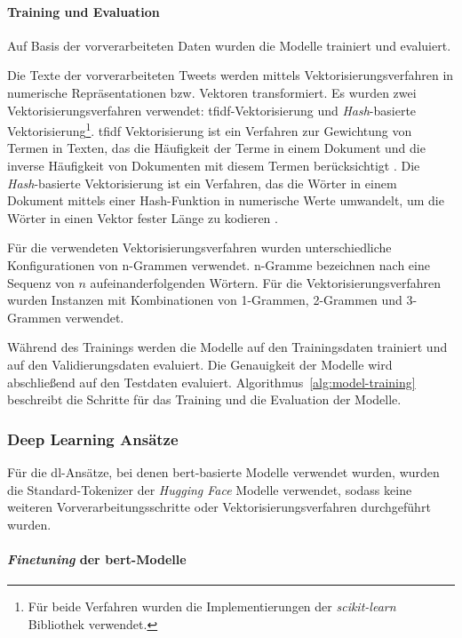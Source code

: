 \paragraph{Training und Evaluation}
Auf Basis der vorverarbeiteten Daten wurden die Modelle trainiert und evaluiert.

Die Texte der vorverarbeiteten Tweets werden mittels Vektorisierungsverfahren in numerische Repräsentationen bzw. Vektoren transformiert.
Es wurden zwei Vekto\-risierungs\-verfahren verwendet: \gls{tfidf}-Vek\-to\-ri\-sie\-rung und \textit{Hash}-basierte Vektorisierung\footnote{Für beide Verfahren wurden die Implementierungen der \textit{scikit-learn} Bibliothek verwendet.}.
\gls{tfidf} Vektorisierung ist ein Verfahren zur Gewichtung von Termen in Texten, das die Häufigkeit der Terme in einem Dokument und die inverse Häufigkeit von Dokumenten mit diesem Termen berücksichtigt \cite[S. 119]{manning2009introduction}.
Die \textit{Hash}-basierte Vektorisierung ist ein Verfahren, das die Wörter in einem Dokument mittels einer Hash-Funktion in numerische Werte umwandelt, um die Wörter in einen Vektor fester Länge zu kodieren \cite{sklearnextraction2025}.

Für die verwendeten Vektorisierungsverfahren wurden unterschiedliche Konfigurationen von n-Grammen verwendet.
n-Gramme bezeichnen nach \cite[S.33]{jm3} eine Sequenz von $n$ aufeinanderfolgenden Wörtern.
Für die Vektorisierungsverfahren wurden Instanzen mit Kombinationen von 1-Grammen, 2-Grammen und 3-Grammen verwendet.

Während des Trainings werden die Modelle auf den Trainingsdaten trainiert und auf den Validierungsdaten evaluiert.
Die Genauigkeit der Modelle wird abschließend auf den Testdaten evaluiert.
Algorithmus~\ref{alg:model-training} beschreibt die Schritte für das Training und die Evaluation der Modelle.

\subsubsection{Deep Learning Ansätze} \label{subsubsec:experimente-deep-learning-ansaetze}

Für die \gls{dl}-Ansätze, bei denen \gls{bert}-basierte Modelle verwendet wurden, wurden die Standard-Tokenizer der \textit{Hugging Face} Modelle verwendet, sodass keine weiteren Vorverarbeitungsschritte oder Vektorisierungsverfahren durchgeführt wurden.

\paragraph{\textit{Finetuning} der \gls{bert}-Modelle}

